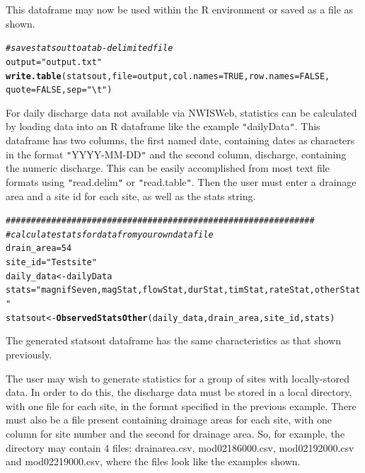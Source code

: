 \documentclass[a4paper,11pt]{article}\usepackage[]{graphicx}\usepackage[]{color}
\makeatletter
\newcommand{\hlnum}[1]{\textcolor[rgb]{0.686,0.059,0.569}{#1}}%
\newcommand{\hlstr}[1]{\textcolor[rgb]{0.192,0.494,0.8}{#1}}%
\newcommand{\hlcom}[1]{\textcolor[rgb]{0.678,0.584,0.686}{\textit{#1}}}%
\newcommand{\hlstd}[1]{\textcolor[rgb]{0.345,0.345,0.345}{#1}}%
\newcommand{\hlkwb}[1]{\textcolor[rgb]{0.69,0.353,0.396}{#1}}%
\newcommand{\hlkwc}[1]{\textcolor[rgb]{0.333,0.667,0.333}{#1}}%
\newcommand{\hlkwd}[1]{\textcolor[rgb]{0.737,0.353,0.396}{\textbf{#1}}}%
\newenvironment{kframe}{%
 \def\at@end@of@kframe{}%
 \ifinner\ifhmode%
  \def\at@end@of@kframe{\end{minipage}}%
  \begin{minipage}{\columnwidth}%
 \fi\fi%
 \def\FrameCommand##1{\hskip\@totalleftmargin \hskip-\fboxsep
 \colorbox{shadecolor}{##1}\hskip-\fboxsep
     \hskip-\linewidth \hskip-\@totalleftmargin \hskip\columnwidth}%
 \MakeFramed {\advance\hsize-\width
   \@totalleftmargin\z@ \linewidth\hsize
   \@setminipage}}%
 {\par\unskip\endMakeFramed%
 \at@end@of@kframe}
\newenvironment{knitrout}{}{} %
\makeatother
\begin{document}
This dataframe may now be used within the R environment or saved as a file as shown.

\begin{knitrout}
\color{fgcolor}\begin{kframe}
\begin{alltt}
\hlcom{# save statsout to a tab-delimited file}
\hlstd{output} \hlkwb{=} \hlstr{"output.txt"}
\hlkwd{write.table}\hlstd{(statsout,} \hlkwc{file} \hlstd{= output,} \hlkwc{col.names} \hlstd{=} \hlnum{TRUE}\hlstd{,} \hlkwc{row.names} \hlstd{=} \hlnum{FALSE}\hlstd{,}
            \hlkwc{quote} \hlstd{=} \hlnum{FALSE}\hlstd{,} \hlkwc{sep} \hlstd{=} \hlstr{"\textbackslash{}t"}\hlstd{)}
\end{alltt}
\end{kframe}
\end{knitrout}

For daily discharge data not available via NWISWeb, statistics can be calculated by loading data into an R dataframe like the example \texttt{"}dailyData\texttt{"}. This dataframe has two columns, the first named date, containing dates as characters in the format \texttt{"}YYYY-MM-DD\texttt{"} and the second column, discharge, containing the numeric discharge. This can be easily accomplished from most text file formats using \texttt{"}read.delim\texttt{"} or \texttt{"}read.table\texttt{"}. Then the user must enter a drainage area and a site id for each site, as well as the stats string.

\begin{knitrout}
\color{fgcolor}\begin{kframe}
\begin{alltt}
\hlcom{#############################################################}
\hlcom{# calculate stats for data from your own data file}
\hlstd{drain_area}\hlkwb{=}\hlnum{54}
\hlstd{site_id}\hlkwb{=}\hlstr{"Test site"}
\hlstd{daily_data}\hlkwb{<-}\hlstd{dailyData}
\hlstd{stats}\hlkwb{=}\hlstr{"magnifSeven,magStat,flowStat,durStat,timStat,rateStat,otherStat"}
\hlstd{statsout} \hlkwb{<-} \hlkwd{ObservedStatsOther}\hlstd{(daily_data,drain_area,site_id,stats)}
\end{alltt}
\end{kframe}
\end{knitrout}

The generated statsout dataframe has the same characteristics as that shown previously. 

The user may wish to generate statistics for a group of sites with locally-stored data. In order to do this, the discharge data must be stored in a local directory, with one file for each site, in the format specified in the previous example. There must also be a file present containing drainage areas for each site, with one column for site number and the second for drainage area. So, for example, the directory may contain 4 files: drainarea.csv, mod02186000.csv, mod02192000.csv and mod02219000.csv, where the files look like the examples shown. 
\end{document}
